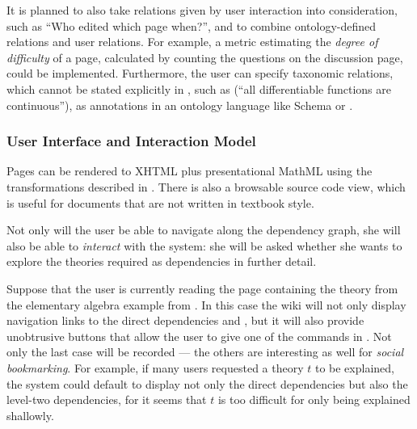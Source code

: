 It is planned to also take relations given by user interaction into consideration, such as
``Who edited which page when?'', and to combine ontology-defined relations and user
relations.  For example, a metric estimating the {\emph{degree of difficulty}} of a page,
calculated by counting the questions on the discussion page, could be implemented.
Furthermore, the user can specify taxonomic relations, which cannot be stated explicitly
in {\omdoc}, such as (``all differentiable functions are continuous''), as annotations in
an ontology language like {\rdf} Schema or {\owl}.

\subsubsection{User Interface and Interaction Model}

Pages can be rendered to XHTML plus presentational MathML using the transformations
described in {}. There is also a browsable source code view, which is
useful for documents that are not written in textbook style.

Not only will the user be able to navigate along the dependency graph, she will also be
able to {\emph{interact}} with the system: she will be asked whether she wants to explore
the theories required as dependencies in further detail.

Suppose that the user is currently reading the page containing the theory {}
from the elementary algebra example from {}. In this case the wiki will
not only display navigation links to the direct dependencies {} and
{}, but it will also provide unobtrusive buttons that allow the user to
give one of the commands in {}. Not only the last case will be
recorded --- the others are interesting as well for \emph{social bookmarking}.  For
example, if many users requested a theory $t$ to be explained, the system could default to
display not only the direct dependencies but also the level-two dependencies, for it seems
that $t$ is too difficult for only being explained shallowly.

